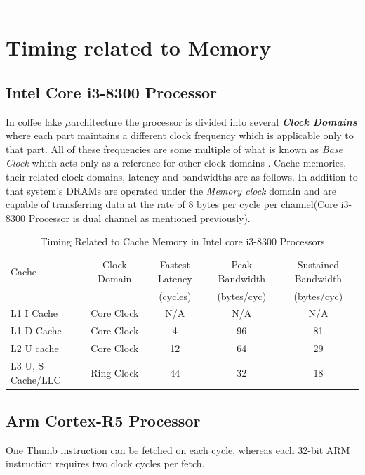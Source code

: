 \documentclass[a4paper,11pt]{article}
\begin{document}
\vspace{1cm}\hrule
\section{Timing related to Memory}

\subsection{Intel Core i3-8300 Processor}
In coffee lake $\mu$architecture the processor is divided into several \textbf{\textit{Clock Domains}} where each part maintains a different clock frequency which is applicable only to that part. All of these frequencies are some multiple of what is known as \textit{Base Clock} which acts only as a reference for other clock domains\cite{Skylake} . Cache memories, their related clock domains, latency and bandwidths are as follows. In addition to that system's DRAMs are operated under the \textit{Memory clock} domain and are capable of transferring data at the rate of 8 bytes per cycle per channel\cite{Coffee}(Core i3-8300 Processor is dual channel as mentioned previously).

 \begin{table}[!h]
	\centering
	\begin{tabular}{l| c|c|c|c }
		Cache &Clock Domain&Fastest Latency&Peak Bandwidth&Sustained Bandwidth\\
		&&(cycles)&(bytes/cyc)&(bytes/cyc)\\\hline
		L1 I Cache&Core Clock &N/A&N/A&N/A\\
		L1 D Cache&Core Clock &4&96&81\\
		L2 U cache&Core Clock &12&64&29\\
		L3 U, S Cache/LLC&Ring Clock&44&32&18\\
		\hline\hline
	\end{tabular}
	\caption{Timing Related to Cache Memory in Intel core i3-8300 Processors\cite{iaorm}}
\end{table}

\subsection{Arm Cortex-R5 Processor} 
One Thumb instruction can be fetched on each cycle, whereas each
32-bit ARM instruction requires two clock cycles per fetch.
\end{document}
